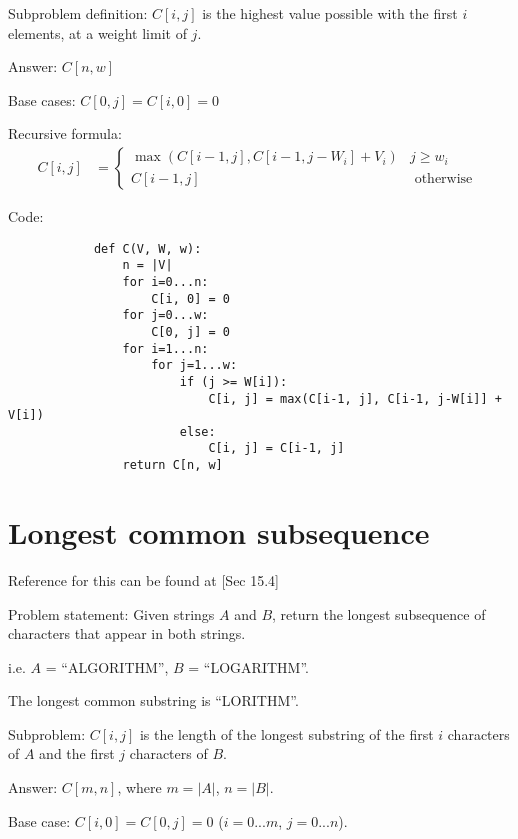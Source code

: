         Subproblem definition: $C[i, j]$ is the highest value possible with the
        first $i$ elements, at a weight limit of $j$.

        Answer: $C[n, w]$

        Base cases: $C[0, j] = C[i, 0] = 0$

        Recursive formula:
        \begin{align*}
            C[i, j] &=
            \left\{
                \begin{array}{lr}
                    \max(C[i-1, j], C[i-1, j-W_i] + V_i) & j \ge w_i \\
                    C[i-1, j] & \text{ otherwise }
                \end{array}
            \right.
        \end{align*}

        Code:
        \begin{verbatim}
            def C(V, W, w):
                n = |V|
                for i=0...n:
                    C[i, 0] = 0
                for j=0...w:
                    C[0, j] = 0
                for i=1...n:
                    for j=1...w:
                        if (j >= W[i]):
                            C[i, j] = max(C[i-1, j], C[i-1, j-W[i]] + V[i])
                        else:
                            C[i, j] = C[i-1, j]
                return C[n, w]
        \end{verbatim}
    \section{Longest common subsequence}
        Reference for this can be found at [Sec 15.4]

        Problem statement: Given strings $A$ and $B$, return the longest
        subsequence of characters that appear in both strings.

        i.e. $A$ = ``ALGORITHM'', $B$ = ``LOGARITHM''.

        The longest common substring is ``LORITHM''.

        Subproblem: $C[i, j]$ is the length of the longest substring of the
        first $i$ characters of $A$ and the first $j$ characters of $B$.

        Answer: $C[m, n]$, where $m = |A|$, $n = |B|$.

        Base case: $C[i, 0] = C[0, j] = 0$  ($i = 0...m$, $j = 0...n$).

